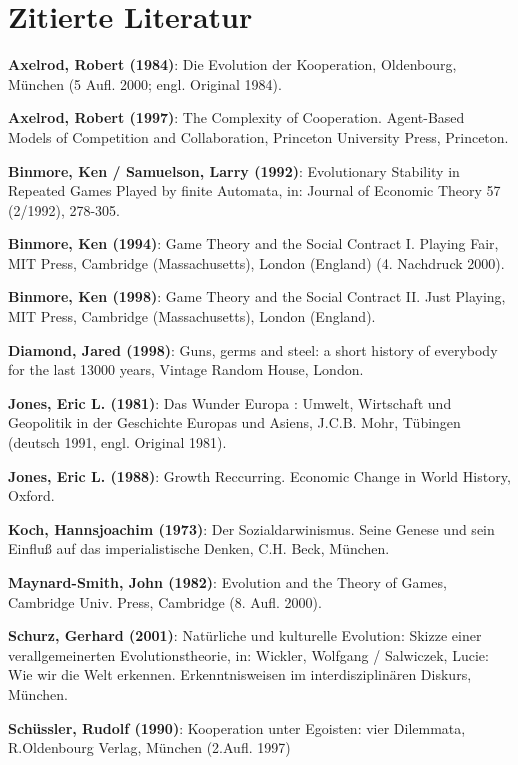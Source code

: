 \documentclass[12pt,a4paper,ngerman]{article}
\begin{document}
\newpage

\section{Zitierte Literatur}

\setlength{\parindent}{0ex}
\setlength{\parskip}{2ex}


{\bf Axelrod, Robert (1984)}: Die Evolution der Kooperation,
Oldenbourg, München (5 Aufl. 2000; engl. Original 1984).

{\bf Axelrod, Robert (1997)}: The Complexity of Cooperation. Agent-Based Models of
Competition and Collaboration, Princeton University Press, Princeton.

{\bf Binmore, Ken / Samuelson, Larry (1992)}: Evolutionary Stability in Repeated Games Played by finite Automata, in: Journal of Economic Theory 57 (2/1992), 278-305.

{\bf Binmore, Ken (1994)}: Game Theory and the Social Contract I. Playing Fair, MIT Press, Cambridge (Massachusetts), London (England) (4. Nachdruck 2000). 

{\bf Binmore, Ken (1998)}: Game Theory and the Social Contract II. Just Playing, MIT Press, Cambridge (Massachusetts), London (England).

{\bf Diamond, Jared (1998)}: Guns, germs and steel: a short history of everybody for
the last 13000 years, Vintage Random House, London.

{\bf Jones, Eric L. (1981)}: Das Wunder Europa : Umwelt, Wirtschaft und Geopolitik in
der Geschichte Europas und Asiens, J.C.B. Mohr, Tübingen (deutsch 1991, engl. Original 1981).

{\bf Jones, Eric L. (1988)}: Growth Reccurring. Economic Change in World History,
Oxford.

{\bf Koch, Hannsjoachim (1973)}: Der Sozialdarwinismus. Seine Genese und sein Einfluß auf das imperialistische Denken, C.H. Beck, München.

{\bf Maynard-Smith, John (1982)}: Evolution and the Theory of Games, Cambridge Univ. Press, Cambridge (8. Aufl. 2000).


{\bf Schurz, Gerhard (2001)}: Natürliche und kulturelle Evolution: Skizze einer
verallgemeinerten Evolutionstheorie, in: Wickler, Wolfgang / Salwiczek, Lucie:
Wie wir die Welt erkennen. Erkenntnisweisen im interdisziplinären Diskurs,
München.

{\bf Schüssler, Rudolf (1990)}: Kooperation unter Egoisten: vier Dilemmata, R.Oldenbourg Verlag, München (2.Aufl. 1997) 
\end{document}
